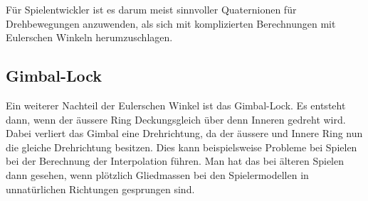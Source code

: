 Für Spielentwickler ist es darum meist sinnvoller Quaternionen für Drehbewegungen anzuwenden, als sich mit komplizierten Berechnungen mit Eulerschen Winkeln herumzuschlagen.
\subsection{Gimbal-Lock}
Ein weiterer Nachteil der Eulerschen Winkel ist das Gimbal-Lock. Es entsteht dann, wenn der äussere Ring Deckungsgleich über denn Inneren gedreht wird. Dabei verliert das Gimbal eine Drehrichtung, da der äussere und Innere Ring nun die gleiche Drehrichtung besitzen. Dies kann beispielsweise Probleme bei Spielen bei der Berechnung der Interpolation führen. Man hat das bei älteren Spielen dann gesehen, wenn plötzlich Gliedmassen bei den Spielermodellen in unnatürlichen Richtungen gesprungen sind.